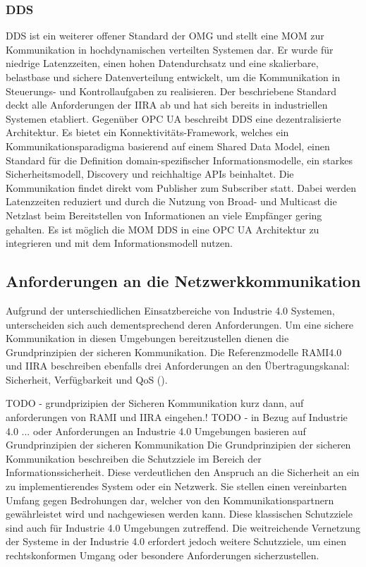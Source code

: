 \subsubsection{\ac{DDS}}
\ac{DDS} ist ein weiterer offener Standard der \ac{OMG} und stellt eine \ac{MOM} zur Kommunikation in hochdynamischen verteilten Systemen dar. Er wurde für niedrige Latenzzeiten, einen hohen Datendurchsatz und eine skalierbare, belastbase und sichere Datenverteilung entwickelt, um die Kommunikation in Steuerungs- und Kontrollaufgaben zu realisieren. Der beschriebene Standard deckt alle Anforderungen der \ac{IIRA} ab und hat sich bereits in industriellen Systemen etabliert. Gegenüber \ac{OPC UA} beschreibt \ac{DDS} eine dezentralisierte Architektur. Es bietet ein Konnektivitäts-Framework, welches ein Kommunikationsparadigma basierend auf einem Shared Data Model, einen Standard für die Definition domain-spezifischer Informationsmodelle, ein starkes Sicherheitsmodell, Discovery und reichhal­tige APIs beinhaltet. Die Kommunikation findet direkt vom Publisher zum Subscriber statt. Dabei werden Latenzzeiten reduziert und durch die Nutzung von Broad- und Multicast die Netzlast beim Bereitstellen von Informationen an viele Empfänger gering gehalten. Es ist möglich die \ac{MOM} \ac{DDS} in eine \ac{OPC UA} Architektur zu integrieren und mit dem Informationsmodell nutzen.

\subsection{Anforderungen an die Netzwerkkommunikation}
\label{Grundlagen:Anforderungen}
Aufgrund der unterschiedlichen Einsatzbereiche von Industrie 4.0 Systemen, unterscheiden sich auch dementsprechend deren Anforderungen. Um eine sichere Kommunikation in diesen Umgebungen bereitzustellen dienen die Grundprinzipien der sicheren Kommunikation. Die Referenzmodelle \ac{RAMI4.0} und \ac{IIRA} beschreiben ebenfalls drei Anforderungen an den Übertragungskanal: Sicherheit, Verfügbarkeit und \ac{QoS} (\cite{BMWiNeCon2016}).

TODO - grundprizipien der Sicheren Kommunikation kurz dann, auf anforderungen von RAMI und IIRA eingehen.!
TODO - in Bezug auf Industrie 4.0 ... oder Anforderungen an Industrie 4.0 Umgebungen basieren auf Grundprinzipien der sicheren Kommunikation
Die Grundprinzipien der sicheren Kommunikation beschreiben die Schutzziele im Bereich der Informationssicherheit. Diese verdeutlichen den Anspruch an die Sicherheit an ein zu implementierendes System oder ein Netzwerk. Sie stellen einen vereinbarten Umfang gegen Bedrohungen dar, welcher von den Kommunikationspartnern gewährleistet wird und nachgewiesen werden kann. Diese klassischen Schutzziele sind auch für Industrie 4.0 Umgebungen zutreffend. Die weitreichende Vernetzung der Systeme in der Industrie 4.0 erfordert jedoch weitere Schutzziele, um einen rechtskonformen Umgang oder besondere Anforderungen sicherzustellen.

